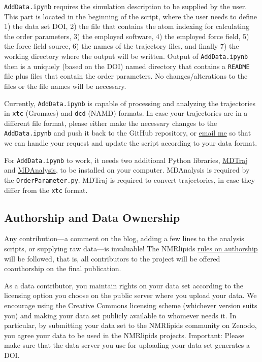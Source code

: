 \documentclass[journal=jpcbfk,manuscript=article,layout=twocolumn]{achemso}
\begin{document}
{\tt AddData.ipynb} requires the simulation description to be supplied by the user. This part is located in the beginning of the script, where the user needs to define
1) the data set DOI,
2) the file that contains the atom indexing for calculating the order parameters,
3) the employed software,
4) the employed force field,
5) the force field source,
6) the names of the trajectory files, and finally
7) the working directory where the output will be written.
Output of {\tt AddData.ipynb} then is a uniquely (based on the DOI) named directory that contains a {\tt README} file plus files that contain the order parameters. No changes/alterations to the files or the file names will be necessary.

Currently, {\tt AddData.ipynb} is capable of processing and analyzing the trajectories in {\tt xtc} (Gromacs) and {\tt dcd} (NAMD) formats. In case your trajectories are in a different file format, please either make the necessary changes to the {\tt AddData.ipynb} and push it back to the GitHub repository, or \href{mailto:b.kav@fz-juelich.de}{email me} so that we can handle your request and update the script according to your data format.

For {\tt AddData.ipynb} to work, it needs two additional Python libraries, \href{http://mdtraj.org/1.9.3/}{MDTraj} and \href{http://mdanalysis.org}{MDAnalysis}, to be installed on your computer. MDAnalysis is required by the {\tt OrderParameter.py}. MDTraj is required to convert trajectories, in case they differ from the {\tt xtc} format.%

\subsection{Authorship and Data Ownership}
Any contribution---a comment on the blog, adding a few lines to the analysis scripts, or supplying raw data---is invaluable!
The NMRlipids \href{https://nmrlipids.blogspot.com/p/blog-page_2.html}{rules on authorship} will be followed, that is, all contributors to the project will be offered coauthorship on the final publication.

As a data contributor, you maintain rights on your data set according to the licensing option you choose on the public server where you upload your data. We encourage using the Creative Commons licensing scheme (whichever version suits you) and making your data set publicly available to whomever needs it. In particular, by submitting your data set to the NMRlipids community on Zenodo, you agree your data to be used in the NMRlipids projects. Important: Please make sure that the data server you use for uploading your data set generates a DOI.




\end{document}
